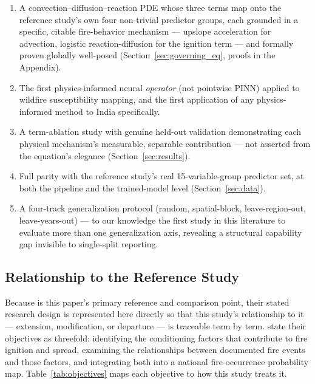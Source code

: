 \documentclass[journal]{IEEEtran}
\begin{document}
\begin{enumerate}
\item A convection--diffusion--reaction PDE whose three terms map onto the reference study's own four non-trivial predictor groups, each grounded in a specific, citable fire-behavior mechanism --- upslope acceleration \cite{rothermel1972} for advection, logistic reaction-diffusion \cite{fisher1937,kpp1937} for the ignition term --- and formally proven globally well-posed (Section~\ref{sec:governing_eq}, proofs in the Appendix).
\item The first physics-informed neural \emph{operator} (not pointwise PINN) applied to wildfire susceptibility mapping, and the first application of any physics-informed method to India specifically.
\item A term-ablation study with genuine held-out validation demonstrating each physical mechanism's measurable, separable contribution --- not asserted from the equation's elegance (Section~\ref{sec:results}).
\item Full parity with the reference study's real 15-variable-group predictor set, at both the pipeline and the trained-model level (Section~\ref{sec:data}).
\item A four-track generalization protocol (random, spatial-block, leave-region-out, leave-years-out) --- to our knowledge the first study in this literature to evaluate more than one generalization axis, revealing a structural capability gap invisible to single-split reporting.
\end{enumerate}

\subsection{Relationship to the Reference Study}

Because \cite{biswas2025} is this paper's primary reference and comparison point, their stated research design is represented here directly so that this study's relationship to it --- extension, modification, or departure --- is traceable term by term. \cite{biswas2025} state their objectives as threefold: identifying the conditioning factors that contribute to fire ignition and spread, examining the relationships between documented fire events and those factors, and integrating both into a national fire-occurrence probability map. Table~\ref{tab:objectives} maps each objective to how this study treats it.
\end{document}
